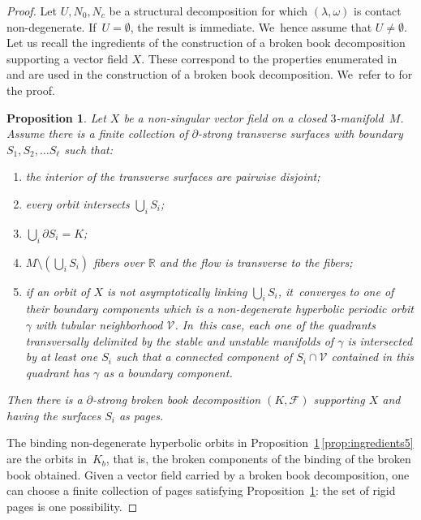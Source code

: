 \documentclass[11pt]{article}
\newcommand{\threemanifold}{$3$\nobreakdash-mani\-fold\xspace}
\newtheorem{prop}[theorem]{Proposition}
\theoremstyle{definition}
\begin{document}
\begin{proof}
Let $U, N_0, N_c$ be a structural decomposition for which $(\lambda,\omega)$ is contact non-degenerate. If~$U=\emptyset$, the result is immediate. We~hence assume that $U\neq \emptyset$. Let us recall the ingredients of the construction of a broken book decomposition supporting a vector field $X$. These correspond to the properties enumerated in \cite[Lem.\,3.6]{CDR} and are used in the construction of a broken book decomposition. We~refer to \cite[\S 3]{CDR} for the proof.

\begin{prop}\label{prop:ingredients}
Let $X$ be a non-singular vector field on a closed \threemanifold~$M$. Assume there is a finite collection of $\partial$-strong transverse surfaces with boundary $S_1, S_2, \ldots S_\ell$ such that:
\begin{enumerate}
\item\label{prop:ingredients1} the {interior of the} transverse surfaces {are pairwise disjoint};
\item\label{prop:ingredients2} every orbit intersects $\bigcup_i S_i$;
\item\label{prop:ingredients3} $\bigcup_i\partial S_i= K$;
\item\label{prop:ingredients4} $M\setminus \left(\bigcup_i S_i\right)$ fibers over $\mathbb{R}$ and the flow is transverse to the fibers;
\item\label{prop:ingredients5} if an orbit of $X$ is not asymptotically linking $\bigcup_i S_i$, it~converges to one of their boundary components which is a non-degenerate hyperbolic periodic orbit $\gamma$ with tubular neighborhood $\mathcal{V}$. In~this case, each one of the quadrants transversally delimited by the stable and unstable manifolds of $\gamma$ is intersected by at least one $S_i$ such that a connected component of $S_i\cap \mathcal{V}$ contained in this quadrant has $\gamma$ as a boundary component.
\end{enumerate}
Then there is a $\partial$-strong broken book decomposition $(K,\mathcal{F})$ supporting $X$ and having the surfaces $S_i$ as pages.
\end{prop}

The binding non-degenerate hyperbolic orbits in Proposition~\ref{prop:ingredients}\,\eqref{prop:ingredients5} are the orbits in~$K_b$, that is, the broken components of the binding of the broken book obtained. Given a vector field carried by a broken book decomposition, one can choose a finite collection of pages satisfying Proposition~\ref{prop:ingredients}: the set of rigid pages is one possibility.


\end{proof}
\end{document}
